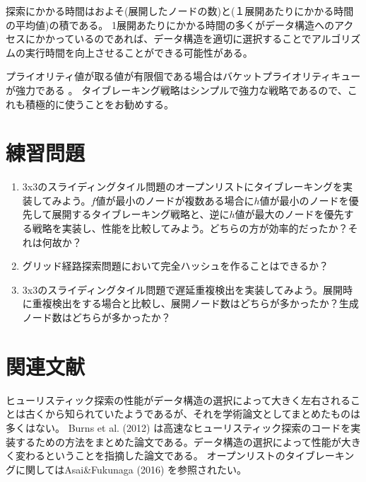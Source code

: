 探索にかかる時間はおよそ(展開したノードの数)と(１展開あたりにかかる時間の平均値)の積である。
1展開あたりにかかる時間の多くがデータ構造へのアクセスにかかっているのであれば、データ構造を適切に選択することでアルゴリズムの実行時間を向上させることができる可能性がある。

プライオリティ値が取る値が有限個である場合はバケットプライオリティキューが強力である \cite{burns2012implementing}。
タイブレーキング戦略はシンプルで強力な戦略であるので、これも積極的に使うことをお勧めする。

\section{練習問題}
\begin{enumerate}
	\item 3x3のスライディングタイル問題のオープンリストにタイブレーキングを実装してみよう。$f$値が最小のノードが複数ある場合に$h$値が最小のノードを優先して展開するタイブレーキング戦略と、逆に$h$値が最大のノードを優先する戦略を実装し、性能を比較してみよう。どちらの方が効率的だったか？それは何故か？
	
	\item グリッド経路探索問題において完全ハッシュを作ることはできるか？

	\item 3x3のスライディングタイル問題で遅延重複検出を実装してみよう。展開時に重複検出をする場合と比較し、展開ノード数はどちらが多かったか？生成ノード数はどちらが多かったか？
\end{enumerate}

\section{関連文献}

ヒューリスティック探索の性能がデータ構造の選択によって大きく左右されることは古くから知られていたようであるが、それを学術論文としてまとめたものは多くはない。
Burns et al. (2012) \cite{burns2012implementing}は高速なヒューリスティック探索のコードを実装するための方法をまとめた論文である。データ構造の選択によって性能が大きく変わるということを指摘した論文である。
オープンリストのタイブレーキングに関してはAsai\&Fukunaga (2016) \cite{asai2016tiebreaking}を参照されたい。



% 
